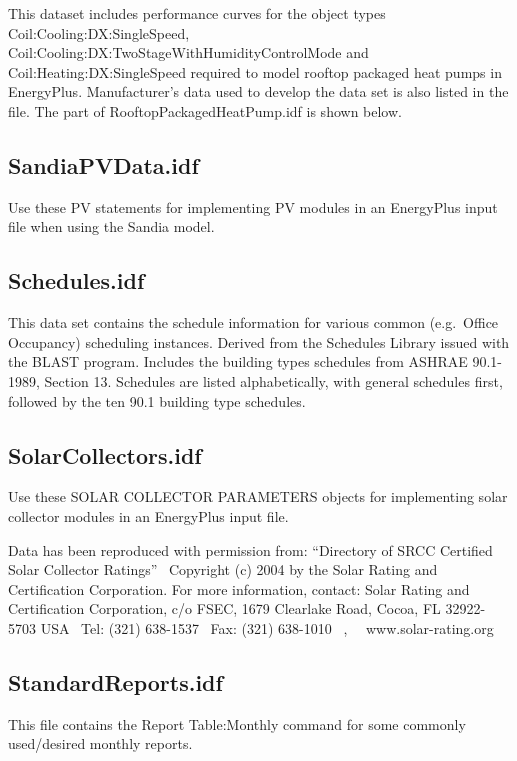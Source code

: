 This dataset includes performance curves for the object types Coil:Cooling:DX:SingleSpeed, Coil:Cooling:DX:TwoStageWithHumidityControlMode and Coil:Heating:DX:SingleSpeed required to model rooftop packaged heat pumps in EnergyPlus. Manufacturer's data used to develop the data set is also listed in the file. The part of RooftopPackagedHeatPump.idf is shown below.

\subsection{SandiaPVData.idf}\label{sandiapvdata.idf-000}

Use these PV statements for implementing PV modules in an EnergyPlus input file when using the Sandia model.

\subsection{Schedules.idf}\label{schedules.idf}

This data set contains the schedule information for various common (e.g.~Office Occupancy) scheduling instances. Derived from the Schedules Library issued with the BLAST program. Includes the building types schedules from ASHRAE 90.1-1989, Section 13. Schedules are listed alphabetically, with general schedules first, followed by the ten 90.1 building type schedules.

\subsection{SolarCollectors.idf}\label{solarcollectors.idf-000}

Use these SOLAR COLLECTOR PARAMETERS objects for implementing solar collector modules in an EnergyPlus input file.

Data has been reproduced with permission from: ``Directory of SRCC Certified Solar Collector Ratings''~ Copyright (c) 2004 by the Solar Rating and Certification Corporation. For more information, contact: Solar Rating and Certification Corporation, c/o FSEC, 1679 Clearlake Road, Cocoa, FL 32922-5703 USA~ Tel: (321) 638-1537~ Fax: (321) 638-1010~ ,~~ www.solar-rating.org

\subsection{StandardReports.idf}\label{standardreports.idf}

This file contains the Report Table:Monthly command for some commonly used/desired monthly reports.

